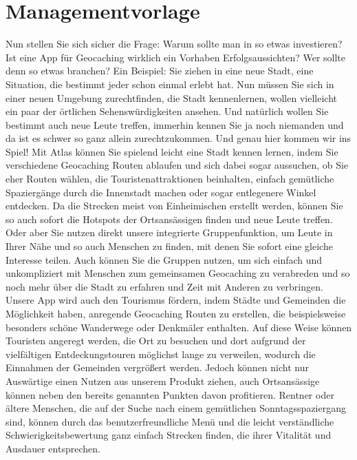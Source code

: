\documentclass[a4paper, 12pp]{article}
\begin{document}
\section{Managementvorlage}
Nun stellen Sie sich sicher die Frage: Warum sollte man in so etwas investieren? Ist eine App für Geocaching wirklich ein Vorhaben Erfolgsaussichten? Wer sollte denn so etwas brauchen?\newline
Ein Beispiel: Sie ziehen in eine neue Stadt, eine Situation, die bestimmt jeder schon einmal erlebt hat. Nun müssen Sie sich in einer neuen Umgebung zurechtfinden, die Stadt kennenlernen, wollen vielleicht ein paar der örtlichen Sehenswürdigkeiten ansehen. Und natürlich wollen Sie bestimmt auch neue Leute treffen, immerhin kennen Sie ja noch niemanden und da ist es schwer so ganz allein zurechtzukommen.
Und genau hier kommen wir ins Spiel!\newline
Mit Atlas können Sie spielend leicht eine Stadt kennen lernen, indem Sie verschiedene Geocaching Routen ablaufen und sich dabei sogar aussuchen, ob Sie eher Routen wählen, die Touristenattraktionen beinhalten, einfach gemütliche Spaziergänge durch die Innenstadt machen oder sogar entlegenere Winkel entdecken. Da die Strecken meist von Einheimischen erstellt werden, können Sie so auch sofort die Hotspots der Ortsansässigen finden und neue Leute treffen.\newline
Oder aber Sie nutzen direkt unsere integrierte Gruppenfunktion, um Leute in Ihrer Nähe und so auch Menschen zu finden, mit denen Sie sofort eine gleiche Interesse teilen. Auch können Sie die Gruppen nutzen, um sich einfach und unkompliziert mit Menschen zum gemeinsamen Geocaching zu verabreden und so noch mehr über die Stadt zu erfahren und Zeit mit Anderen zu verbringen.\newline
Unsere App wird auch den Tourismus fördern, indem Städte und Gemeinden die Möglichkeit haben, anregende Geocaching Routen zu erstellen, die beispielsweise besonders schöne Wanderwege oder Denkmäler enthalten. Auf diese Weise können Touristen angeregt werden, die Ort zu besuchen und dort aufgrund der vielfältigen Entdeckungstouren möglichst lange zu verweilen, wodurch die Einnahmen der Gemeinden  vergrößert werden.\newline
Jedoch können nicht nur Auswärtige einen Nutzen aus unserem Produkt ziehen, auch Ortsansässige können neben den bereits genannten Punkten davon profitieren.\newline
Rentner oder ältere Menschen, die auf der Suche nach einem gemütlichen Sonntagsspaziergang sind, können durch das benutzerfreundliche Menü und die leicht verständliche Schwierigkeitsbewertung ganz einfach Strecken finden, die ihrer Vitalität und Ausdauer entsprechen.
\end{document}
